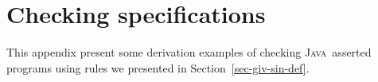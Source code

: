 \documentclass[a4paper]{llncs}
\newcommand{\java}{\textsc{Java}}
\begin{document}
\appendix
\section{Checking specifications}
\label{ane-der-exa}


This appendix present some derivation examples of checking \java~asserted programs using rules we presented in Section~\ref{sec-giv-sin-def}. 



\end{document}
